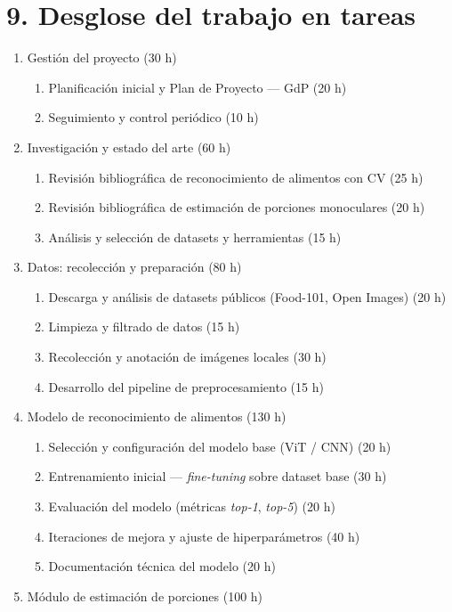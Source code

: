 \documentclass[
11pt, %
]{charter}
\begin{document}
\section{9. Desglose del trabajo en tareas}
\label{sec:wbs}

\begin{enumerate}
\item Gestión del proyecto (30 h)
	\begin{enumerate}
	\item Planificación inicial y Plan de Proyecto --- GdP (20 h)
	\item Seguimiento y control periódico (10 h)
	\end{enumerate}
\item Investigación y estado del arte (60 h)
	\begin{enumerate}
	\item Revisión bibliográfica de reconocimiento de alimentos con CV (25 h)
	\item Revisión bibliográfica de estimación de porciones monoculares (20 h)
	\item Análisis y selección de datasets y herramientas (15 h)
	\end{enumerate}
\item Datos: recolección y preparación (80 h)
	\begin{enumerate}
	\item Descarga y análisis de datasets públicos (Food-101, Open Images) (20 h)
	\item Limpieza y filtrado de datos (15 h)
	\item Recolección y anotación de imágenes locales (30 h)
	\item Desarrollo del pipeline de preprocesamiento (15 h)
	\end{enumerate}
\item Modelo de reconocimiento de alimentos (130 h)
	\begin{enumerate}
	\item Selección y configuración del modelo base (ViT / CNN) (20 h)
	\item Entrenamiento inicial --- \textit{fine-tuning} sobre dataset base (30 h)
	\item Evaluación del modelo (métricas \textit{top-1}, \textit{top-5}) (20 h)
	\item Iteraciones de mejora y ajuste de hiperparámetros (40 h)
	\item Documentación técnica del modelo (20 h)
	\end{enumerate}
\item Módulo de estimación de porciones (100 h)

\end{enumerate}
\end{document}
